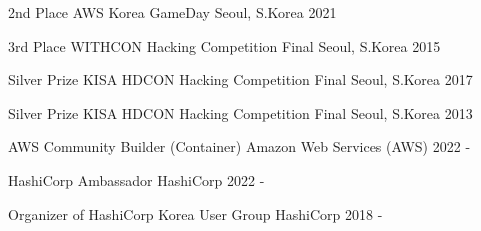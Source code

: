

\begin{cvhonors}

  \cvhonor
    {2nd Place} %
    {AWS Korea GameDay} %
    {Seoul, S.Korea} %
    {2021} %

  \cvhonor
    {3rd Place} %
    {WITHCON Hacking Competition Final} %
    {Seoul, S.Korea} %
    {2015} %

  \cvhonor
    {Silver Prize} %
    {KISA HDCON Hacking Competition Final} %
    {Seoul, S.Korea} %
    {2017} %

  \cvhonor
    {Silver Prize} %
    {KISA HDCON Hacking Competition Final} %
    {Seoul, S.Korea} %
    {2013} %

\end{cvhonors}



\begin{cvhonors}

  \cvhonor
    {AWS Community Builder (Container)} %
    {Amazon Web Services (AWS)} %
    {} %
    {2022 - } %

  \cvhonor
    {HashiCorp Ambassador} %
    {HashiCorp} %
    {} %
    {2022 - } %

  \cvhonor
    {Organizer of HashiCorp Korea User Group} %
    {HashiCorp} %
    {} %
    {2018 - } %

\end{cvhonors}
